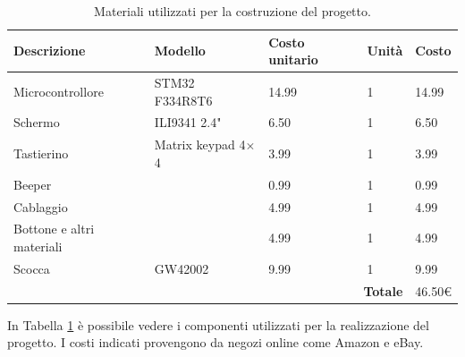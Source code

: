 \documentclass[a4paper]{article}
\begin{document}
\begin{table}[h!t] %
    \centering
    \begin{tabular}{|llll|l|}
        \hline
        \multicolumn{1}{|l|}{\textbf{Descrizione}}          & \multicolumn{1}{l|}{\textbf{Modello}}       & \multicolumn{1}{l|}{\textbf{Costo unitario}} & \textbf{Unità} & \textbf{Costo} \\ \hline
        \multicolumn{1}{|l|}{Microcontrollore}       & \multicolumn{1}{l|}{STM32 F334R8T6}         & \multicolumn{1}{l|}{14.99}                   & 1               & 14.99          \\ \hline
        \multicolumn{1}{|l|}{Schermo}                & \multicolumn{1}{l|}{ILI9341 2.4"}           & \multicolumn{1}{l|}{6.50}                    & 1               & 6.50           \\ \hline
        \multicolumn{1}{|l|}{Tastierino}          & \multicolumn{1}{l|}{Matrix keypad 4$\times$4} & \multicolumn{1}{l|}{3.99}                    & 1               & 3.99           \\ \hline
        \multicolumn{1}{|l|}{Beeper}                 & \multicolumn{1}{l|}{}                       & \multicolumn{1}{l|}{0.99}                    & 1               & 0.99           \\ \hline
        \multicolumn{1}{|l|}{Cablaggio} & \multicolumn{1}{l|}{}                       & \multicolumn{1}{l|}{4.99}                    & 1               & 4.99           \\ \hline
        \multicolumn{1}{|l|}{Bottone e altri materiali} & \multicolumn{1}{l|}{}       & \multicolumn{1}{l|}{4.99}                    & 1               & 4.99           \\ \hline
        \multicolumn{1}{|l|}{Scocca} & \multicolumn{1}{l|}{GW42002}                       & \multicolumn{1}{l|}{9.99}                    & 1               & 9.99           \\ \hline
        \multicolumn{4}{|r|}{\textbf{Totale}}                                                      & 46.50\euro    \\ \hline
    \end{tabular}
    \caption{
        Materiali utilizzati per la costruzione del progetto.
    }
    \label{tab:components}
\end{table}

In Tabella \ref{tab:components} è possibile vedere i componenti utilizzati per la realizzazione del progetto. I costi indicati provengono da negozi online come Amazon e eBay.
\end{document}
